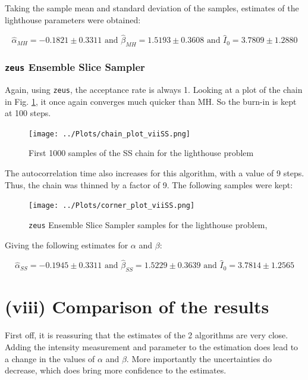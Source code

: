 \documentclass[12pt]{report} %
\begin{document}
Taking the sample mean and standard deviation of the samples, estimates of the lighthouse parameters were obtained:

\begin{equation}
    \hat{\alpha}_{MH} = -0.1821 \pm 0.3311 \text{ and } \hat{\beta}_{MH} = 1.5193 \pm 0.3608 \text{ and } \hat{I}_{0} = 3.7809 \pm 1.2880
\end{equation}

\subsection{\texttt{zeus} Ensemble Slice Sampler}

Again, using \texttt{zeus}, the acceptance rate is always 1. Looking at a plot of the chain in Fig. \ref{fig:SS_convergence_vii}, it once again converges much quicker than MH. So the burn-in is kept at 100 steps.


\begin{figure}[h]
    \centering
    \texttt{[image: ../Plots/chain\_plot\_viiSS.png]}
    \caption{First 1000 samples of the SS chain for the lighthouse problem}
    \label{fig:SS_convergence_vii}
    \end{figure}

The autocorrelation time also increases for this algorithm, with a value of 9 steps. Thus, the chain was thinned by a factor of 9. The following samples were kept:

\newpage

\begin{figure}[h]
\centering
\texttt{[image: ../Plots/corner\_plot\_viiSS.png]}
\caption{\texttt{zeus} Ensemble Slice Sampler samples for the lighthouse problem, }
\label{fig:SS_samples_vii}
\end{figure}

Giving the following estimates for $\alpha$ and $\beta$:

\begin{equation}
    \hat{\alpha}_{SS} = -0.1945 \pm 0.3311 \text{ and } \hat{\beta}_{SS} = 1.5229 \pm 0.3639 \text{ and } \hat{I}_{0} = 3.7814 \pm 1.2565
\end{equation}


\chapter{(viii) Comparison of the results}

First off, it is reassuring that the estimates of the 2 algorithms are very close. Adding the intensity measurement and parameter to the estimation does lead to a change in the values of $\alpha$ and $\beta$. More importantly the uncertainties do decrease, which does bring more confidence to the estimates.



\end{document}
